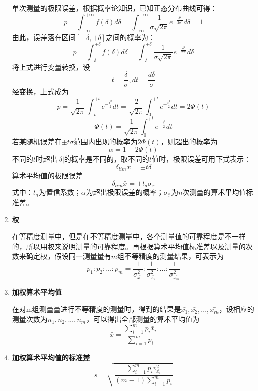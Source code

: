 \begin{enumerate}
	\qquad 单次测量的极限误差，根据概率论知识，已知正态分布曲线可得：
	\begin{equation} p=\int_{-\infty}^{+\infty}f(\delta)d\delta=\int_{-\infty}^{+\infty}\frac{1}{\sigma\sqrt{2\pi}}e^{-\frac{\delta^2}{2\sigma^2}}d\delta=1
	\end{equation}
	由此，误差落在区间$ [-\delta,+\delta] $之间的概率为：
	\begin{equation}
	p=\int_{-\delta}^{+\delta}f(\delta)d\delta=\int_{-\delta}^{+\delta}\frac{1}{\sigma\sqrt{2\pi}}e^{-\frac{\delta^2}{2\sigma^2}}d\delta
	\end{equation}
	将上式进行变量转换，设
	\begin{equation}
	t=\frac{\delta}{\sigma},dt=\frac{d\delta}{\sigma}
	\end{equation}
	经变换，上式成为
	\begin{equation}
	p=\frac{1}{\sqrt{2\pi}}\int_{-t}^{+t}e^{-\frac{t^2}{2}}dt=\frac{2}{\sqrt{2\pi}}\int_{0}^{+t}e^{-\frac{t^2}{2}}dt=2\Phi(t)
	\end{equation}\begin{equation}
	\Phi(t)=\frac{1}{\sqrt{2\pi}}\int_{0}^{+t}e^{-\frac{t^2}{2}}dt
	\end{equation}
	若某随机误差在$ \pm t\sigma $范围内出现的概率为$ 2\Phi(t) $，则超出的概率为
	\begin{equation}
	\alpha=1-2\Phi(t)
	\end{equation}
	不同的$ t $时超出$ |\delta| $的概率是不同的，取不同的$ t $值时，极限误差可用下式表示：
	\begin{equation}
	\delta_{lim}x=\pm t\delta
	\end{equation}
	\qquad 算术平均值的极限误差
	\begin{equation} \delta_{lim}\bar{x}=\pm t_a\sigma_{\bar{x}} \end{equation}
	式中：$ t_a $为置信系数；$ \alpha $为超出极限误差的概率；$ \sigma_{\bar{x}} $为$ n $次测量的算术平均值标准差。
	\item \textbf{权}
	
	\qquad 在等精度测量中，但是在不等精度测量中，各个测量值的可靠程度是不一样的，所以用权来说明测量的可靠程度。再根据算术平均值标准差以及测量的次数来确定权，假设同一测量量有$ m $组不等精度的测量结果，可表示为
	\begin{equation}
	p_1:p_2:...:p_m=\frac{1}{\sigma_{\bar{x_1}}^2}:\frac{1}{\sigma_{\bar{x_2}}^2}:...:\frac{1}{\sigma_{\bar{x_m}}^2}
	\end{equation}
	\item \textbf{加权算术平均值}
	
	\qquad 在对m组测量量进行不等精度的测量时，得到的结果是$ \bar{x_1},\bar{x_2},...,\bar{x_m} $，设相应的测量次数为$ n_1,n_2,...,n_m $，可以得出全部测量的算术平均值为
	\begin{equation}
	\bar{x}=\frac{\sum\limits_{i=1}^{m}p_i\bar{x}_i}{\sum\limits_{i=1}^{m}p_i}
	\end{equation}
	\item \textbf{加权算术平均值的标准差}
	\begin{equation}
	\bar{s}=\sqrt{\frac{\sum\limits_{i=1}^{m}p_iv_{\bar{x_i}}^2}{(m-1)\sum\limits_{i=1}^{m}p_i}}
	\end{equation}
\end{enumerate}
